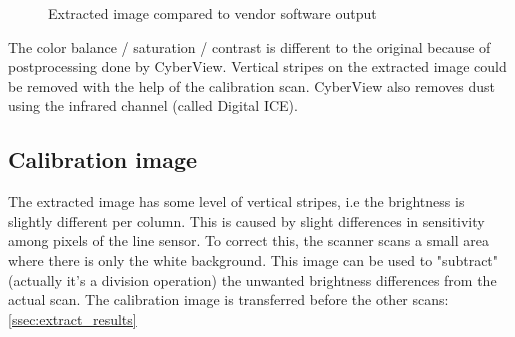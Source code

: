 \documentclass{article}
\begin{document}
\begin{figure}[H]
  \caption{Extracted image compared to vendor software output}
  \centering
  
\end{figure}

The color balance / saturation / contrast is different to the original because of postprocessing
done by CyberView. Vertical stripes on the extracted image could be removed with
the help of the calibration scan.
CyberView also removes dust using the infrared channel (called Digital ICE).

\subsection{Calibration image}
\label{ssec:calibration}

The extracted image has some level of vertical stripes, i.e the brightness is
slightly different per column. This is caused by slight differences in sensitivity
among pixels of the line sensor.
To correct this, the scanner scans a small area where there is only the white background.
This image can be used to "subtract" (actually it's a division operation) the unwanted
brightness differences from the actual scan.
The calibration image is transferred before the other scans: \autoref{ssec:extract_results}
\end{document}
